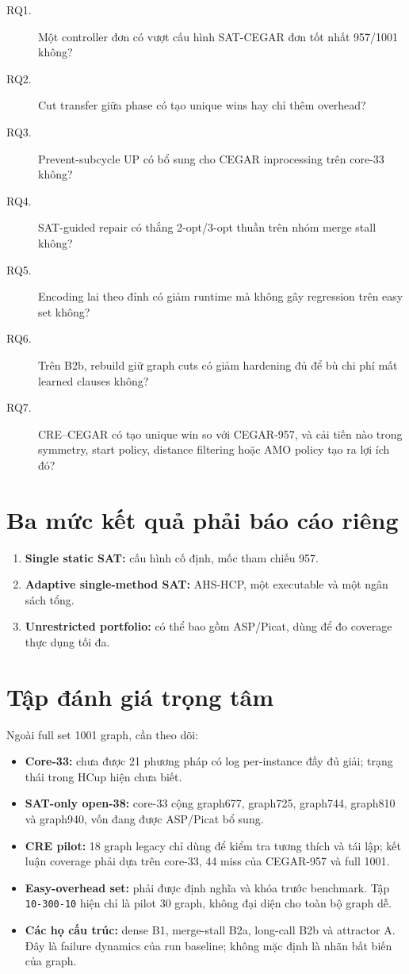 \documentclass[11pt,a4paper,oneside]{scrreprt}
\newcommand{\code}[1]{\texttt{#1}}
\begin{document}
\begin{description}
  \item[RQ1.] Một controller đơn có vượt cấu hình SAT-CEGAR đơn tốt nhất 957/1001 không?
  \item[RQ2.] Cut transfer giữa phase có tạo unique wins hay chỉ thêm overhead?
  \item[RQ3.] Prevent-subcycle UP có bổ sung cho CEGAR inprocessing trên core-33 không?
  \item[RQ4.] SAT-guided repair có thắng 2-opt/3-opt thuần trên nhóm merge stall không?
  \item[RQ5.] Encoding lai theo đỉnh có giảm runtime mà không gây regression trên easy set không?
  \item[RQ6.] Trên B2b, rebuild giữ graph cuts có giảm hardening đủ để bù chi phí mất learned clauses không?
  \item[RQ7.] CRE--CEGAR có tạo unique win so với CEGAR-957, và cải tiến nào trong symmetry, start policy, distance filtering hoặc AMO policy tạo ra lợi ích đó?
\end{description}

\section{Ba mức kết quả phải báo cáo riêng}

\begin{enumerate}
  \item \textbf{Single static SAT:} cấu hình cố định, mốc tham chiếu 957.
  \item \textbf{Adaptive single-method SAT:} AHS-HCP, một executable và một ngân sách tổng.
  \item \textbf{Unrestricted portfolio:} có thể bao gồm ASP/Picat, dùng để đo coverage thực dụng tối đa.
\end{enumerate}

\section{Tập đánh giá trọng tâm}

Ngoài full set 1001 graph, cần theo dõi:

\begin{itemize}
  \item \textbf{Core-33:} chưa được 21 phương pháp có log per-instance đầy đủ giải; trạng thái trong HCup hiện chưa biết.
  \item \textbf{SAT-only open-38:} core-33 cộng graph677, graph725, graph744, graph810 và graph940, vốn đang được ASP/Picat bổ sung.
  \item \textbf{CRE pilot:} 18 graph legacy chỉ dùng để kiểm tra tương thích và tái lập; kết luận coverage phải dựa trên core-33, 44 miss của CEGAR-957 và full 1001.
  \item \textbf{Easy-overhead set:} phải được định nghĩa và khóa trước benchmark. Tập \code{10-300-10} hiện chỉ là pilot 30 graph, không đại diện cho toàn bộ graph dễ.
  \item \textbf{Các họ cấu trúc:} dense B1, merge-stall B2a, long-call B2b và attractor A. Đây là failure dynamics của run baseline; không mặc định là nhãn bất biến của graph.
\end{itemize}
\end{document}
